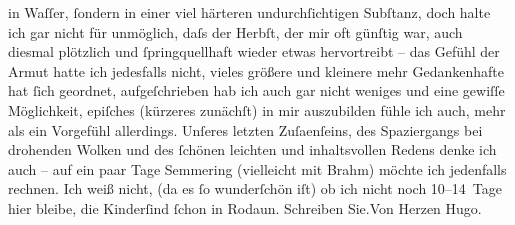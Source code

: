 \begin{ledgroupsized}[t]{13cm}
               in Waſſer, ſondern in einer viel härteren undurchſichtigen Subſtanz, doch halte ich
               gar nicht für unmöglich, daſs der Herbſt, der mir oft günſtig war, auch diesmal
               plötzlich und ſpringquellhaft wieder etwas {\pb}hervortreibt – das Gefühl der
               Armut hatte ich jedesfalls nicht, vieles größere und kleinere mehr Gedankenhafte hat
               ſich geordnet, aufgeſchrieben hab ich auch gar nicht weniges und eine gewiſſe
               Möglichkeit, epiſches (kürzeres zunächſt) in mir auszubilden fühle ich auch, mehr als
               ein Vorgefühl {\pb}allerdings. Unſeres
               letzten Zuſa{\geminationm}enſeins, des Spaziergangs bei drohenden
               Wolken und des ſchönen leichten und inhaltsvollen Redens denke ich auch – auf ein
               paar Tage Semmering (vielleicht mit Brahm) möchte ich jedenfalls rechnen.\pend
           \pstart
           Ich weiß nicht, (da es ſo wunderſchön iſt) ob ich nicht noch 10–14 Tage hier bleibe,
               die Kinderſind ſchon in Rodaun.\pend
           \pstart
            Schreiben Sie.\hspace*{1.5em}Von Herzen\pend
           \pstart \spacefill\mbox{Hugo.}\pend{}
         
         \endnumbering{}\end{ledgroupsized}  \newcommand{\dateiname}{L01624}\newcommand{\titel}{Hugo von Hofmannsthal an Arthur Schnitzler, 4. [9. 1906]}\newcommand{\editorInnen}{Martin Anton Müller und Gerd-Hermann Susen}
      